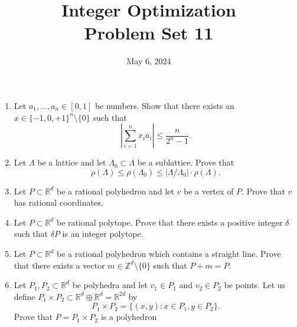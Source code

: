 \documentclass[11pt,a4paper]{article}
\title{Integer Optimization  \\ Problem Set 11 }
\date{ May 6, 2024}
\renewcommand{\leq}{\leqslant}
\begin{document}
\maketitle 


\begin{enumerate}

  \item Let $a_1 ,\hdots,a_n∈ [0,1]$ be numbers. Show that there exists an $x \in \{-1, 0, +1\}^n \setminus \{0\}$ such that $$\left\vert \displaystyle\sum_{i =1}^n x_i a_i \right\vert \leq \frac{n}{2^n -1}.$$

  \item Let $Λ$ be a lattice and let $Λ_0 ⊂ Λ$ be a sublattice. Prove that $$ρ(Λ) ≤ ρ(Λ_0) ≤ |Λ/Λ_0| \cdot ρ(Λ).$$

  \item Let $P ⊂ \mathbb{R}^d$ be a rational polyhedron and let $v$ be a vertex of $P$. Prove that $v$ has rational coordinates.

  \item Let $P ⊂ \mathbb{R}^d$ be rational polytope. Prove that there exists a positive integer $δ$ such that $δP$ is an integer polytope.

  \item Let $P ⊂ \mathbb{R}^d$ be a rational polyhedron which contains a straight line. Prove that there exists a vector $m ∈ \mathbb{Z}^d \setminus \{0\}$ such that $P + m = P$.

  \item Let $P_1,P_2 ⊂ \mathbb{R}^d$ be polyhedra and let $v_1 ∈ P_1$ and $v_2 ∈ P_2$ be points. Let us define $P_1 × P_2 ⊂ \mathbb{R}^d ⊕ \mathbb{R}^d = \mathbb{R}^{2d}$ by
$$P_1×P_2= \{(x,y): x∈P_1,y∈P_2\}.$$ 
Prove that $P = P_1 × P_2$ is a polyhedron
      
      

\end{enumerate}


%
%


 
\end{document}
